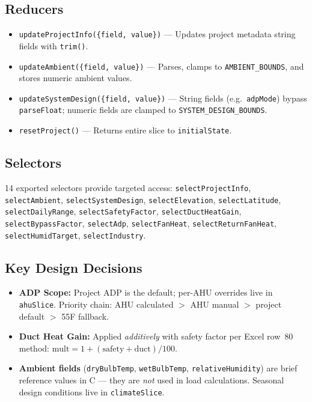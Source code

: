 \documentclass[12pt, a4paper, oneside]{report}
\newcommand{\code}[1]{\texttt{\textcolor{codered}{#1}}}
\begin{document}
\subsection{Reducers}

\begin{itemize}
  \item \code{updateProjectInfo(\{field, value\})} --- Updates project metadata string fields with \code{trim()}.
  \item \code{updateAmbient(\{field, value\})} --- Parses, clamps to \code{AMBIENT\_BOUNDS}, and stores numeric ambient values.
  \item \code{updateSystemDesign(\{field, value\})} --- String fields (e.g.\ \code{adpMode}) bypass \code{parseFloat}; numeric fields are clamped to \code{SYSTEM\_DESIGN\_BOUNDS}.
  \item \code{resetProject()} --- Returns entire slice to \code{initialState}.
\end{itemize}

\subsection{Selectors}

14 exported selectors provide targeted access: \code{selectProjectInfo}, \code{selectAmbient}, \code{selectSystemDesign}, \code{selectElevation}, \code{selectLatitude}, \code{selectDailyRange}, \code{selectSafetyFactor}, \code{selectDuctHeatGain}, \code{selectBypassFactor}, \code{selectAdp}, \code{selectFanHeat}, \code{selectReturnFanHeat}, \code{selectHumidTarget}, \code{selectIndustry}.

\subsection{Key Design Decisions}

\begin{itemize}
  \item \textbf{ADP Scope:} Project ADP is the default; per-AHU overrides live in \code{ahuSlice}. Priority chain: AHU calculated $>$ AHU manual $>$ project default $>$ 55\textdegree F fallback.
  \item \textbf{Duct Heat Gain:} Applied \emph{additively} with safety factor per Excel row~80 method: $\text{mult} = 1 + (\text{safety} + \text{duct}) / 100$.
  \item \textbf{Ambient fields} (\code{dryBulbTemp}, \code{wetBulbTemp}, \code{relativeHumidity}) are brief reference values in \textdegree C --- they are \emph{not} used in load calculations. Seasonal design conditions live in \code{climateSlice}.
\end{itemize}
\end{document}
